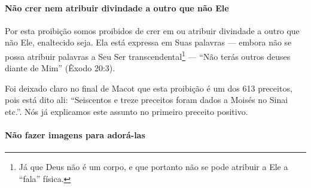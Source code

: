 %
%
%
%
%
%
%
%
%
%
%
%
%
%
%
%
%
%
%
%

\setcounter{paragraph}{0}
\setcounter{secnumdepth}{4}

\paragraph{Não crer nem atribuir divindade a outro que não Ele}

Por esta proibição somos proibidos de crer em ou atribuir divindade a
outro que não Ele, enaltecido seja. Ela está expressa em Suas palavras
--- embora não se possa atribuir palavras a Seu Ser
transcendental\footnote{Já que Deus não é um corpo, e que portanto não se pode atribuir a Ele a ``fala'' física.} --- ``Não terás outros deuses
diante de Mim'' (Êxodo 20:3).

Foi deixado claro no final de Macot que esta proibição é um dos 613
preceitos, pois está dito ali: ``Seiscentos e treze preceitos foram
dados a Moisés no Sinai etc.''. Nós já explicamos este assunto no
primeiro preceito positivo.

\paragraph{Não fazer imagens para adorá-las}

